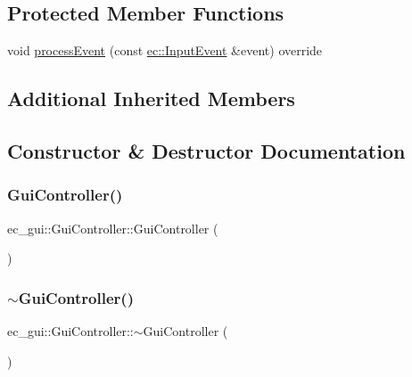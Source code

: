 \subsection*{Protected Member Functions}
\begin{DoxyCompactItemize}
\item 
void \mbox{\hyperlink{classec__gui_1_1_gui_controller_a3435c1c74eff0dc75c27142d0d86b4c5}{process\+Event}} (const \mbox{\hyperlink{structec_1_1_input_event}{ec\+::\+Input\+Event}} \&event) override
\end{DoxyCompactItemize}
\subsection*{Additional Inherited Members}


\subsection{Constructor \& Destructor Documentation}
\mbox{\label{classec__gui_1_1_gui_controller_addbc4de5b44cf9cb31c9e75ef7cb831e}} 
\subsubsection{\texorpdfstring{Gui\+Controller()}{GuiController()}}
{\footnotesize\ttfamily ec\+\_\+gui\+::\+Gui\+Controller\+::\+Gui\+Controller (\begin{DoxyParamCaption}{ }\end{DoxyParamCaption})\hspace{0.3cm}{\ttfamily [explicit]}}

\mbox{\label{classec__gui_1_1_gui_controller_a09a337aecb5e13dffb38693a60c33530}} 
\subsubsection{\texorpdfstring{$\sim$\+Gui\+Controller()}{~GuiController()}}
{\footnotesize\ttfamily ec\+\_\+gui\+::\+Gui\+Controller\+::$\sim$\+Gui\+Controller (\begin{DoxyParamCaption}{ }\end{DoxyParamCaption})\hspace{0.3cm}{\ttfamily [default]}}



